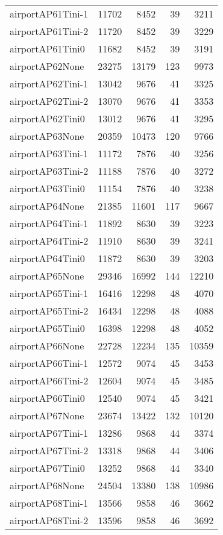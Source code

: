 \begin{longtable}{lrrrr}
airportAP61Tini-1 & 11702 & 8452 & 39 & 3211 \\
airportAP61Tini-2 & 11720 & 8452 & 39 & 3229 \\
airportAP61Tini0 & 11682 & 8452 & 39 & 3191 \\
airportAP62None & 23275 & 13179 & 123 & 9973 \\
airportAP62Tini-1 & 13042 & 9676 & 41 & 3325 \\
airportAP62Tini-2 & 13070 & 9676 & 41 & 3353 \\
airportAP62Tini0 & 13012 & 9676 & 41 & 3295 \\
airportAP63None & 20359 & 10473 & 120 & 9766 \\
airportAP63Tini-1 & 11172 & 7876 & 40 & 3256 \\
airportAP63Tini-2 & 11188 & 7876 & 40 & 3272 \\
airportAP63Tini0 & 11154 & 7876 & 40 & 3238 \\
airportAP64None & 21385 & 11601 & 117 & 9667 \\
airportAP64Tini-1 & 11892 & 8630 & 39 & 3223 \\
airportAP64Tini-2 & 11910 & 8630 & 39 & 3241 \\
airportAP64Tini0 & 11872 & 8630 & 39 & 3203 \\
airportAP65None & 29346 & 16992 & 144 & 12210 \\
airportAP65Tini-1 & 16416 & 12298 & 48 & 4070 \\
airportAP65Tini-2 & 16434 & 12298 & 48 & 4088 \\
airportAP65Tini0 & 16398 & 12298 & 48 & 4052 \\
airportAP66None & 22728 & 12234 & 135 & 10359 \\
airportAP66Tini-1 & 12572 & 9074 & 45 & 3453 \\
airportAP66Tini-2 & 12604 & 9074 & 45 & 3485 \\
airportAP66Tini0 & 12540 & 9074 & 45 & 3421 \\
airportAP67None & 23674 & 13422 & 132 & 10120 \\
airportAP67Tini-1 & 13286 & 9868 & 44 & 3374 \\
airportAP67Tini-2 & 13318 & 9868 & 44 & 3406 \\
airportAP67Tini0 & 13252 & 9868 & 44 & 3340 \\
airportAP68None & 24504 & 13380 & 138 & 10986 \\
airportAP68Tini-1 & 13566 & 9858 & 46 & 3662 \\
airportAP68Tini-2 & 13596 & 9858 & 46 & 3692 \\

\end{longtable}
